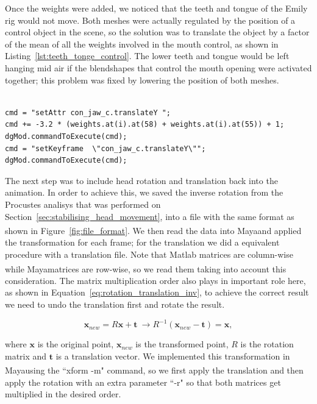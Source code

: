 \documentclass[11pt]{report}
\newcommand{\Maya}{Maya\textsuperscript\textregistered}
\begin{document}
Once the weights were added, we noticed that the teeth and tongue of the Emily rig would not move.
Both meshes were actually regulated by the position of a control object in the scene, so the solution was to translate the object by a factor of the mean of all the weights involved in the mouth control, as shown in Listing~\ref{lst:teeth_tonge_control}.
The lower teeth and tongue would be left hanging mid air if the blendshapes that control the mouth opening were activated together; this problem was fixed by lowering the position of both meshes.

\begin{lstlisting}[caption = Teeth and tongue control based on relevant weights., label = lst:teeth_tonge_control, frame=single, float]

cmd = "setAttr con_jaw_c.translateY ";
cmd += -3.2 * (weights.at(i).at(58) + weights.at(i).at(55)) + 1;
dgMod.commandToExecute(cmd);
cmd = "setKeyframe  \"con_jaw_c.translateY\"";
dgMod.commandToExecute(cmd);
\end{lstlisting}

The next step was to include head rotation and translation back into the animation.
In order to achieve this, we saved the inverse rotation from the Procustes analisys that was performed on Section~\ref{sec:stabilising_head_movement}, into a file with the same format as shown in Figure~\ref{fig:file_format}.
We then read the data into \Maya and applied the transformation for each frame; for the translation we did a equivalent procedure with a translation file.
Note that Matlab matrices are column-wise while \Maya matrices are row-wise, so we read them taking into account this consideration.
The matrix multiplication order also plays in important role here, as shown in Equation~\ref{eq:rotation_translation_inv}, to achieve the correct result we need to undo the translation first and rotate the result.

\begin{equation}
\mathbf{x}_{new} = R\mathbf{x} + \mathbf{t} ~ \rightarrow  R^{-1}(\mathbf{x}_{new} - \mathbf{t}) = \mathbf{x},
\label{eq:rotation_translation_inv}
\end{equation}

where $\mathbf{x}$ is the original point, $\mathbf{x}_{new}$ is the transformed point, $R$ is the rotation matrix and $\mathbf{t}$ is a translation vector.
We implemented this transformation in \Maya using the ``xform -m" command, so we first apply the translation and then apply the rotation with an extra parameter ``-r" so that both matrices get multiplied in the desired order.
\end{document}

